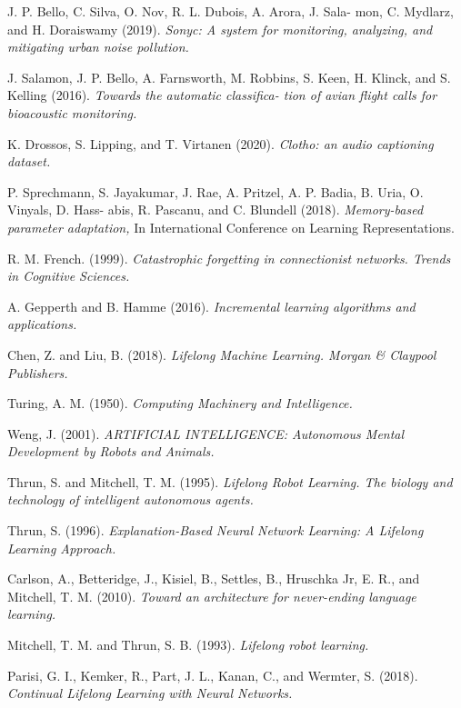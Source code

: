 \documentclass[english, LaM, oneside]{sapthesis}%
\begin{document}
\begin{thebibliography}{17}
 J. P. Bello, C. Silva, O. Nov, R. L. Dubois, A. Arora, J. Sala- mon, C. Mydlarz, and H. Doraiswamy (2019). \textit{Sonyc: A system for monitoring, analyzing, and mitigating urban noise pollution.} 
 
 J. Salamon, J. P. Bello, A. Farnsworth, M. Robbins, S. Keen, H. Klinck, and S. Kelling (2016). \textit{Towards the automatic classifica- tion of avian flight calls for bioacoustic monitoring.} 
 
  K. Drossos, S. Lipping, and T. Virtanen (2020). \textit{Clotho: an audio captioning dataset.} 

 P. Sprechmann, S. Jayakumar, J. Rae, A. Pritzel, A. P. Badia, B. Uria, O. Vinyals, D. Hass- abis, R. Pascanu, and C. Blundell (2018). \textit{Memory-based parameter adaptation,} In International Conference on Learning Representations. 

 R. M. French. (1999). \textit{Catastrophic forgetting in connectionist networks. Trends in Cognitive Sciences.} 
 
 
A. Gepperth and B. Hamme (2016). \textit{Incremental learning algorithms and applications.} 
 
Chen, Z. and Liu, B. (2018). \textit{Lifelong Machine Learning. Morgan & Claypool Publishers.} 


Turing, A. M. (1950). \textit{Computing Machinery and Intelligence.} 

Weng, J. (2001). \textit{ARTIFICIAL INTELLIGENCE: Autonomous Mental Development by Robots and Animals.} 

Thrun, S. and Mitchell, T. M. (1995). \textit{Lifelong Robot Learning. The biology and technology of intelligent autonomous agents.} 

Thrun, S. (1996). \textit{Explanation-Based Neural Network Learning: A Lifelong Learning Approach.} 

Carlson, A., Betteridge, J., Kisiel, B., Settles, B., Hruschka Jr, E. R., and Mitchell, T. M. (2010). \textit{Toward an architecture for never-ending language learning.} 

Mitchell, T. M. and Thrun, S. B. (1993).  \textit{Lifelong robot learning.} 


Parisi, G. I., Kemker, R., Part, J. L., Kanan, C., and Wermter, S. (2018). \textit{ Continual Lifelong Learning with Neural Networks.} 
 

\end{thebibliography}
\end{document}

